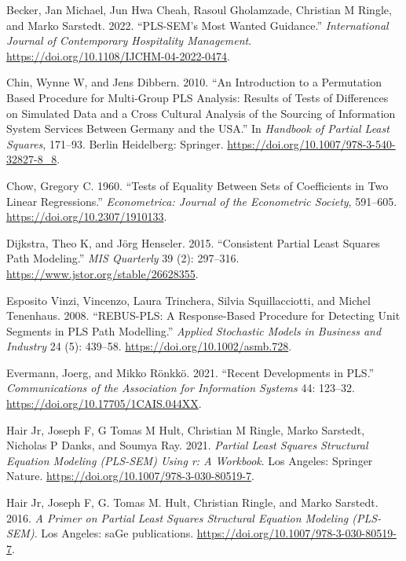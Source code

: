 \hypertarget{refs}{}
\begin{CSLReferences}{1}{0}
\leavevmode{}%
Becker, Jan Michael, Jun Hwa Cheah, Rasoul Gholamzade, Christian M Ringle, and Marko Sarstedt. 2022. {``PLS-SEM's Most Wanted Guidance.''} \emph{International Journal of Contemporary Hospitality Management}. \url{https://doi.org/10.1108/IJCHM-04-2022-0474}.

\leavevmode{}%
Chin, Wynne W, and Jens Dibbern. 2010. {``An Introduction to a Permutation Based Procedure for Multi-Group PLS Analysis: Results of Tests of Differences on Simulated Data and a Cross Cultural Analysis of the Sourcing of Information System Services Between Germany and the USA.''} In \emph{Handbook of Partial Least Squares}, 171--93. Berlin Heidelberg: Springer. \url{https://doi.org/10.1007/978-3-540-32827-8_8}.

\leavevmode{}%
Chow, Gregory C. 1960. {``Tests of Equality Between Sets of Coefficients in Two Linear Regressions.''} \emph{Econometrica: Journal of the Econometric Society}, 591--605. \url{https://doi.org/10.2307/1910133}.

\leavevmode{}%
Dijkstra, Theo K, and Jörg Henseler. 2015. {``Consistent Partial Least Squares Path Modeling.''} \emph{MIS Quarterly} 39 (2): 297--316. \url{https://www.jstor.org/stable/26628355}.

\leavevmode{}%
Esposito Vinzi, Vincenzo, Laura Trinchera, Silvia Squillacciotti, and Michel Tenenhaus. 2008. {``REBUS-PLS: A Response-Based Procedure for Detecting Unit Segments in PLS Path Modelling.''} \emph{Applied Stochastic Models in Business and Industry} 24 (5): 439--58. \url{https://doi.org/10.1002/asmb.728}.

\leavevmode{}%
Evermann, Joerg, and Mikko Rönkkö. 2021. {``Recent Developments in PLS.''} \emph{Communications of the Association for Information Systems} 44: 123--32. \url{https://doi.org/10.17705/1CAIS.044XX}.

\leavevmode{}%
Hair Jr, Joseph F, G Tomas M Hult, Christian M Ringle, Marko Sarstedt, Nicholas P Danks, and Soumya Ray. 2021. \emph{Partial Least Squares Structural Equation Modeling (PLS-SEM) Using r: A Workbook}. Los Angeles: Springer Nature. \url{https://doi.org/10.1007/978-3-030-80519-7}.

\leavevmode{}%
Hair Jr, Joseph F, G. Tomas M. Hult, Christian Ringle, and Marko Sarstedt. 2016. \emph{A Primer on Partial Least Squares Structural Equation Modeling (PLS-SEM)}. Los Angeles: saGe publications. \url{https://doi.org/10.1007/978-3-030-80519-7}.


\end{CSLReferences}
